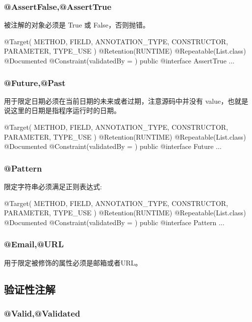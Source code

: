 \subsubsection{@AssertFalse,@AssertTrue}

被注解的对象必须是 True 或 False，否则抛错。

\begin{Java}
@Target({ METHOD, FIELD, ANNOTATION_TYPE, CONSTRUCTOR, PARAMETER, TYPE_USE })
@Retention(RUNTIME)
@Repeatable(List.class)
@Documented
@Constraint(validatedBy = { })
public @interface AssertTrue {
    ...
}
\end{Java}

\subsubsection{@Future,@Past}

用于限定日期必须在当前日期的未来或者过期，注意源码中并没有 value，也就是说这里的日期是指程序运行时的日期。

\begin{Java}
@Target({ METHOD, FIELD, ANNOTATION_TYPE, CONSTRUCTOR, PARAMETER, TYPE_USE })
@Retention(RUNTIME)
@Repeatable(List.class)
@Documented
@Constraint(validatedBy = { })
public @interface Future {
    ...
}
\end{Java}

\subsubsection{@Pattern}

限定字符串必须满足正则表达式:

\begin{Java}
@Target({ METHOD, FIELD, ANNOTATION_TYPE, CONSTRUCTOR, PARAMETER, TYPE_USE })
@Retention(RUNTIME)
@Repeatable(List.class)
@Documented
@Constraint(validatedBy = { })
public @interface Pattern {
    ...
}
\end{Java}

\subsubsection{@Email,@URL}

用于限定被修饰的属性必须是邮箱或者URL。

\subsection{验证性注解}

\subsubsection{@Valid,@Validated}

